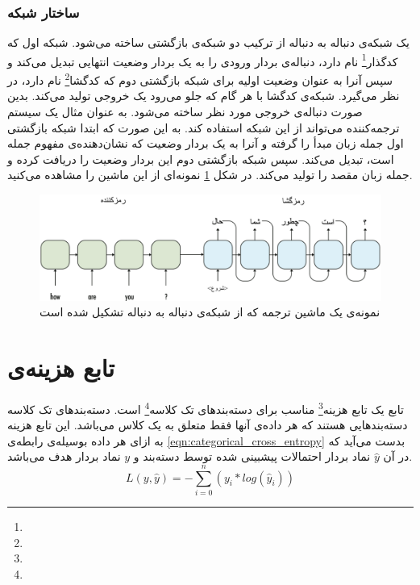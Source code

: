 \subsubsection{ساختار شبکه}
یک شبکه‌ی دنباله به دنباله از ترکیب دو شبکه‌ی بازگشتی ساخته می‌شود. شبکه اول که کدگذار\footnote{} نام دارد، دنباله‌ی بردار ورودی را به یک بردار وضعیت انتهایی تبدیل می‌کند و سپس آنرا به عنوان وضعیت اولیه برای شبکه بازگشتی دوم که کدگشا\footnote{} نام دارد، در نظر می‌گیرد. شبکه‌ی کدگشا با هر گام که جلو می‌رود یک خروجی تولید می‌کند. بدین صورت دنباله‌ی خروجی مورد نظر ساخته می‌شود.
به عنوان مثال یک سیستم ترجمه‌کننده می‌تواند از این شبکه استفاده کند. به این صورت که ابتدا شبکه بازگشتی اول جمله زبان مبدأ را گرفته و آنرا به یک بردار وضعیت که نشان‌دهنده‌ی مفهوم جمله است، تبدیل می‌کند. سپس شبکه بازگشتی دوم این بردار وضعیت را دریافت کرده و جمله زبان مقصد را تولید می‌کند. در شکل \ref{fig:seq2seq} نمونه‌ای از این ماشین را مشاهده می‌کنید.

\begin{figure}[t!]
	\centering
	\includegraphics[scale=0.35]{figures/seq2seq.png}
	\caption[نمونه‌ای از شبکه‌ی دنباله به دنباله]{نمونه‌ی یک ماشین ترجمه که از شبکه‌ی دنباله به دنباله تشکیل شده است}
	\label{fig:seq2seq}
\end{figure}

\section{تابع هزینه‌ی }
تابع  یک تابع هزینه\footnote{} مناسب برای دسته‌بندهای تک کلاسه\footnote{} است. دسته‌بندهای تک کلاسه دسته‌بندهایی هستند که هر داده‌ی آنها فقط متعلق به یک کلاس می‌باشد. این تابع هزینه به ازای هر داده بوسیله‌ی رابطه‌ی \ref{eqn:categorical_cross_entropy} بدست می‌آید که در آن $\hat{y}$ نماد بردار احتمالات پیشبینی شده توسط دسته‌بند و $y$ نماد بردار هدف می‌باشد.
\begin{equation}
\label{eqn:categorical_cross_entropy}
L(y, \hat{y}) = - \sum_{i = 0}^{n} (y_i * log(\hat{y}_i))
\end{equation}
